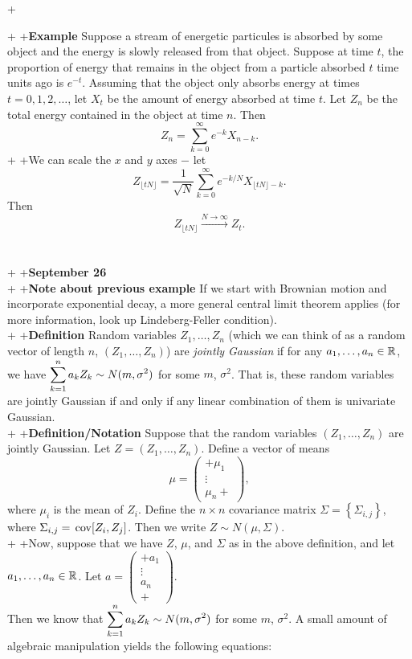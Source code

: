 +\documentclass{article}
\begin{document}
+
+\textbf{Example} Suppose a stream of energetic particules is absorbed by some object and the energy is slowly released from that object.  Suppose at time $t$, the proportion of energy that remains in the object from a particle absorbed $t$ time units ago is $e^{-t}$.  Assuming that the object only absorbs energy at times $t=0,1,2,\dots$, let $X_t$ be the amount of energy absorbed at time $t$.  Let $Z_n$ be the total energy contained in the object at time $n$.  Then \[Z_n=\sum_{k=0}^\infty e^{-k}X_{n-k}.\]
+
+We can scale the $x$ and $y$ axes $-$ let \[Z_{\lfloor tN\rfloor}=\frac{1}{\sqrt{N}}\sum_{k=0}^\infty e^{-k/N}X_{\lfloor tN\rfloor-k}.\]  Then \[Z_{\lfloor tN\rfloor}\xrightarrow{N\to\infty}Z_t.\] \\\\
+
+\textbf{\Large September 26}\\
+
+\textbf{Note about previous example} If we start with Brownian motion and incorporate exponential decay, a more general central limit theorem applies (for more information, look up Lindeberg-Feller condition).\\
+
+\textbf{Definition} Random variables $Z_1,\dots,Z_n$ (which we can think of as a random vector of length $n$, $(Z_1,\dots,Z_n)$) are \emph{jointly Gaussian} if for any $a_1,\dots,a_n\in\mathbb{R}$, we have $\displaystyle\sum_{k=1}^n a_kZ_k\sim N(m,\sigma^2)$ for some $m$, $\sigma^2$.  That is, these random variables are jointly Gaussian if and only if any linear combination of them is univariate Gaussian.\\
+
+\textbf{Definition/Notation} Suppose that the random variables $(Z_1,\dots,Z_n)$ are jointly Gaussian.  Let $Z=(Z_1,\dots,Z_n)$.  Define a vector of means \[\mu=\left(\begin{array}{ccc}
+\mu_1 \\ \vdots \\ \mu_n
+\end{array}\right),\] where $\mu_i$ is the mean of $Z_i$.  Define the $n\times n$ covariance matrix $\Sigma=\left\{\Sigma_{i,j}\right\}$, where $\Sigma_{i,j}=\,\mathrm{cov}[Z_i,Z_j]$.  Then we write $Z\sim N(\mu, \Sigma)$.\\
+
+Now, suppose that we have $Z$, $\mu$, and $\Sigma$ as in the above definition, and let $a_1,\dots,a_n\in\mathbb{R}$.  Let $a=\left(\begin{array}{c}
+a_1\\ \vdots\\ a_n\\
+\end{array}\right).$\\ Then we know that $\displaystyle\sum_{k=1}^n a_kZ_k\sim N(m,\sigma^2)$ for some $m$, $\sigma^2$.  A small amount of algebraic manipulation yields the following equations:
\end{document}
